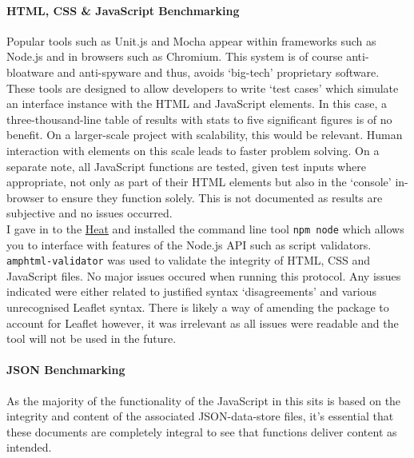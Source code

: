 \documentclass[11pt, english]{article}
\begin{document}
			\paragraph{HTML, CSS \& JavaScript Benchmarking}

 	Popular tools such as Unit.js and Mocha appear within frameworks such as Node.js and in browsers such as Chromium. This system is of course anti-bloatware and anti-spyware and thus, avoids `big-tech' proprietary software. These tools are designed to allow developers to write `test cases' which simulate an interface instance with the HTML and JavaScript elements. In this case, a three-thousand-line table of results with stats to five significant figures is of no benefit. On a larger-scale project with scalability, this would be relevant. Human interaction with elements on this scale leads to faster problem solving. On a separate note, all JavaScript functions are tested, given test inputs where appropriate, not only as part of their HTML elements but also in the `console' in-browser to ensure they function solely. This is not documented as results are subjective and no issues occurred.\\

	I gave in to the \href{https://www.youtube.com/watch?v=ZL9fnVtz_lc}{Heat} and installed the command line tool \texttt{npm node} which allows you to interface with features of the Node.js API such as script validators. \texttt{amphtml-validator} was used to validate the integrity of HTML, CSS and JavaScript files. No major issues occured when running this protocol. Any issues indicated were either related to justified syntax `disagreements' and various unrecognised Leaflet syntax. There is likely a way of amending the package to account for Leaflet however, it was irrelevant as all issues were readable and the tool will not be used in the future.

			\paragraph{JSON Benchmarking}

	As the majority of the functionality of the JavaScript in this sits is based on the integrity and content of the associated JSON-data-store files, it's essential that these documents are completely integral to see that functions deliver content as intended.\\
\end{document}
